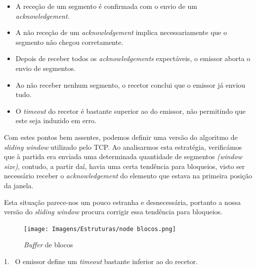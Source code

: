         \begin{itemize}
            
            \item A receção de um segmento é confirmada com o envio de um \textit{acknowledgement}.

            \item A não receção de um \textit{acknowledgement} implica necessariamente que o segmento não chegou corretamente.

            \item Depois de receber todos os \textit{acknowledgements} expectáveis, o emissor aborta o envio de segmentos.

            \item Ao não receber nenhum segmento, o recetor conclui que o emissor já enviou tudo.

            \item O \textit{timeout} do recetor é bastante superior ao do emissor, não permitindo que este seja induzido em erro.
            
        \end{itemize}

        Com estes pontos bem assentes, podemos definir uma versão do algoritmo de \textit{sliding window} utilizado pelo TCP. Ao analisarmos esta estratégia, verificámos que à partida era enviada uma determinada quantidade de segmentos \textit{(window size)}, contudo, a partir daí, havia uma certa tendência para bloqueios, visto ser necessário receber o \textit{acknowledgement} do elemento que estava na primeira posição da janela.

        Esta situação parece-nos um pouco estranha e desnecessária, portanto a nossa versão do \textit{sliding window} procura corrigir essa tendência para bloqueios.

        \begin{figure}
            \begin{center}
            \vspace{-25pt}
            \texttt{[image: Imagens/Estruturas/node blocos.png]}
            \caption{\textit{Buffer} de blocos}
            \vspace{-50pt}
            \end{center}
        \end{figure}

        \hspace{4.5pt}1.~ O emissor define um \textit{timeout} bastante inferior ao do recetor.

